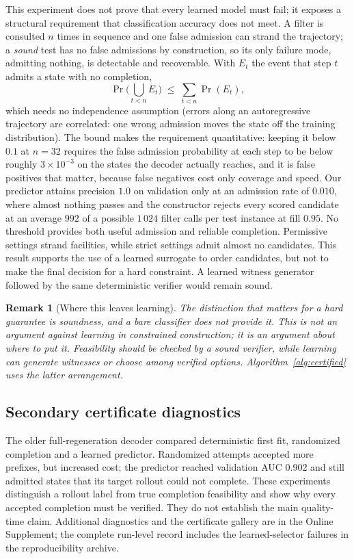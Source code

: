 \documentclass[preprint,12pt,authoryear]{elsarticle}
\newtheorem{rem}{Remark}
\begin{document}
This experiment does not prove that every learned model must fail; it exposes
a structural requirement that classification accuracy does not meet. A filter
is consulted $n$ times in sequence and one false admission can strand the
trajectory; a \emph{sound} test has no false admissions by construction, so
its only failure mode, admitting nothing, is detectable and recoverable. With
$E_t$ the event that step $t$ admits a state with no completion,
\begin{equation}
\Pr\Big(\bigcup_{t<n} E_t\Big)\;\le\;\sum_{t<n}\Pr(E_t),
\label{eq:union}
\end{equation}
which needs no independence assumption (errors along an autoregressive
trajectory are correlated: one wrong admission moves the state off the
training distribution). The bound makes the requirement quantitative: keeping
it below $0.1$ at $n=32$ requires the false admission probability at each step to be below
roughly $3\times10^{-3}$ on the states the decoder actually reaches, and it is
false positives that matter, because false negatives cost only coverage and
speed. Our predictor attains precision $1.0$ on validation only at an
admission rate of $0.010$, where almost nothing passes and the constructor
rejects every scored candidate at an average $992$ of a possible $1\,024$
filter calls per test instance at fill $0.95$. No threshold provides both useful
admission and reliable completion. Permissive settings strand facilities, while
strict settings admit almost no candidates. This result supports the use of a
learned surrogate to order candidates, but not to make the final decision for a
hard constraint. A learned witness generator followed by the same deterministic
verifier would remain sound.

\begin{rem}[Where this leaves learning]
\label{rem:soundness}
The distinction that matters for a hard guarantee is soundness, and a bare
classifier does not provide it. This is not an argument against learning in
constrained construction; it is an argument about where to put it. Feasibility
should be checked by a sound verifier, while learning can generate witnesses or
choose among verified options. Algorithm~\ref{alg:certified} uses the latter
arrangement.
\end{rem}

\fi

\subsection{Secondary certificate diagnostics}
The older full-regeneration decoder compared deterministic first fit, randomized
completion and a learned predictor. Randomized attempts accepted more prefixes,
but increased cost; the predictor reached validation AUC 0.902 and still admitted
states that its target rollout could not complete. These experiments distinguish
a rollout label from true completion feasibility and show why every accepted
completion must be verified. They do not establish the main quality-time claim.
Additional diagnostics and the certificate gallery are in the Online
Supplement; the complete run-level record includes the learned-selector failures
in the reproducibility archive.
\end{document}
